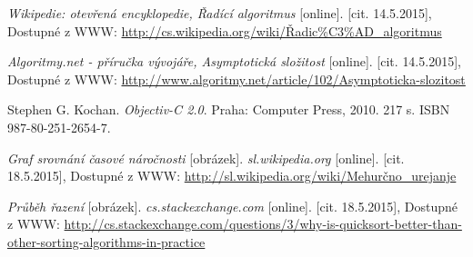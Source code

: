 \documentclass[a4paper,11pt]{article}
\begin{document}
	\begin{thebibliography}{120}
		\textit{Wikipedie: otevřená encyklopedie, Řadící algoritmus} [online]. 
		[cit. {14.5.2015}],
		Dostupné z WWW:
		\url{http://cs.wikipedia.org/wiki/Řadic%C3%AD_algoritmus}
		
		\textit{Algoritmy.net - příručka vývojáře, Asymptotická složitost} [online]. 
		[cit. {14.5.2015}],
		Dostupné z WWW:
		\url{http://www.algoritmy.net/article/102/Asymptoticka-slozitost}
		
		 Stephen G. Kochan.
		\textit{Objectiv-C 2.0}.
		Praha: Computer Press, 2010. 217 s. ISBN 987-80-251-2654-7.

		\textit{Graf srovnání časové náročnosti} [obrázek]. 
		\textit{sl.wikipedia.org} [online].
		[cit. {18.5.2015}],
		Dostupné z WWW:
		\url{http://sl.wikipedia.org/wiki/Mehurčno_urejanje}

		\textit{Průběh řazení} [obrázek]. 
		\textit{cs.stackexchange.com} [online]. 
		[cit. {18.5.2015}],
		Dostupné z WWW:
		\url{http://cs.stackexchange.com/questions/3/why-is-quicksort-better-than-other-sorting-algorithms-in-practice}
		
	\end{thebibliography}
	
\end{document}
